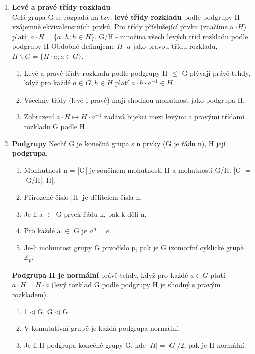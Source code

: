 \documentclass[12pt,a4paper]{article}
\begin{document}
\begin{enumerate}
		\item \textbf{Levé a pravé třídy rozkladu} \\
		Celá grupa G se rozpadá na tzv. \textbf{levé třídy rozkladu} podle podgrupy H vzájemně ekvivalenstních prvků.  Pro třídy příslušející prvku (značíme a $\cdot H$) platí: $a \cdot H = \{a \cdot h; h \in H\}$. G/H - množina všech levých tříd rozkladu podle podgrupy H
		Obdobně definujeme $H \cdot a$ jako pravou třídu rozkladu, $H \backslash G = \{H \cdot a; a \in G\}$.
		
		\begin{enumerate}
			\item Levé a pravé třídy rozkladu podle podgrupy H $\leq$ G plývají právě tehdy, když pro každé $a \in G, h \in H$ platí $a \cdot h \cdot a^{-1} \in H$.
			\item Všechny třídy (levé i pravé) mají shodnou mohutnost jako podgrupa H.
			\item Zobrazení $a \cdot H \mapsto H \cdot a^{-1}$ zadává bijekci mezi levými a pravými třídami rozkladu G podle H.
		\end{enumerate}
		
		\item \textbf{Podgrupy}
		Nechť G je konečná grupa s n prvky (G je řádu n), H její \textbf{podgrupa}.
		\begin{enumerate}
			\item Mohhutnost n = |G| je součinem mohutnosti H a mohutnosti G/H. |G| = |G/H|.|H|.
			\item Přirozené číslo |H| je dělitelem čísla n.
			\item Je-li a $\in$ G prvek řádu k, pak k dělí n.
			\item Pro každé a $\in$ G je $a^n = e$.
			\item Je-li mohuntost grupy G prvočíslo p, pak je G izomorfní cyklické grupě $\mathbb{Z}_p$. 
		\end{enumerate}
		
		\textbf{Podgrupa H je normální} právě tehdy, když pro každé $a \in G$ ptatí $a\cdot H = H\cdot a$ (levý rozklad G podle podgrupy H je shodný s pravým rozkladem).
		\begin{enumerate}
			\item 1 $\lhd$ G, G $\lhd$ G
			\item V komutativní grupě je každá podgrupa normální.
			\item Je-li H podgrupa konečné grupy G, kde $|H|=|G|/2$, pak je H normální.
		\end{enumerate}
		

\end{enumerate}
\end{document}
